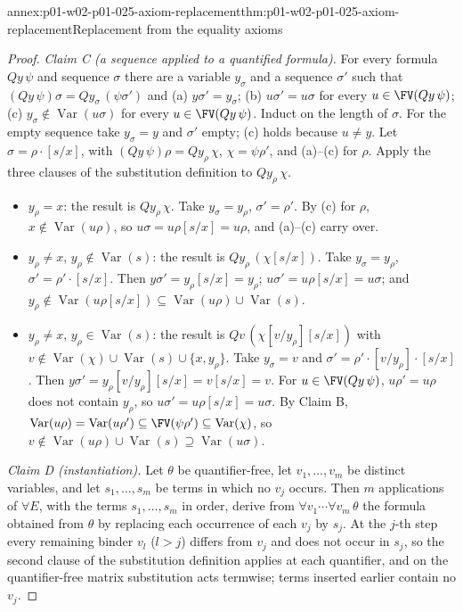 \begin{annexitem}{annex:p01-w02-p01-025-axiom-replacement}{thm:p01-w02-p01-025-axiom-replacement}{Replacement from the equality axioms}
\begin{proof}
\emph{Claim C (a sequence applied to a quantified formula).}  For every
formula \(Qy\,\psi\) and sequence \(\sigma\) there are a variable
\(y_\sigma\) and a sequence \(\sigma'\) such that
\((Qy\,\psi)\sigma=Qy_\sigma\,(\psi\sigma')\) and
(a) \(y\sigma'=y_\sigma\); (b) \(u\sigma'=u\sigma\) for every
\(u\in\FV(Qy\,\psi)\); (c) \(y_\sigma\notin\operatorname{Var}(u\sigma)\) for
every \(u\in\FV(Qy\,\psi)\).  Induct on the length of \(\sigma\).  For the
empty sequence take \(y_\sigma=y\) and \(\sigma'\) empty; (c) holds because
\(u\ne y\).  Let \(\sigma=\rho\cdot[s/x]\), with
\((Qy\,\psi)\rho=Qy_\rho\,\chi\), \(\chi=\psi\rho'\), and (a)--(c) for
\(\rho\).  Apply the three clauses of the substitution definition to
\(Qy_\rho\,\chi\).
\begin{itemize}
 \item \(y_\rho=x\): the result is \(Qy_\rho\,\chi\).  Take
 \(y_\sigma=y_\rho\), \(\sigma'=\rho'\).  By (c) for \(\rho\),
 \(x\notin\operatorname{Var}(u\rho)\), so \(u\sigma=u\rho[s/x]=u\rho\), and
 (a)--(c) carry over.
 \item \(y_\rho\ne x\), \(y_\rho\notin\operatorname{Var}(s)\): the result is
 \(Qy_\rho\,(\chi[s/x])\).  Take \(y_\sigma=y_\rho\),
 \(\sigma'=\rho'\cdot[s/x]\).  Then \(y\sigma'=y_\rho[s/x]=y_\rho\);
 \(u\sigma'=u\rho[s/x]=u\sigma\); and
 \(y_\rho\notin\operatorname{Var}(u\rho[s/x])\subseteq
 \operatorname{Var}(u\rho)\cup\operatorname{Var}(s)\).
 \item \(y_\rho\ne x\), \(y_\rho\in\operatorname{Var}(s)\): the result is
 \(Qv\,(\chi[v/y_\rho][s/x])\) with \(v\notin\operatorname{Var}(\chi)\cup
 \operatorname{Var}(s)\cup\{x,y_\rho\}\).  Take \(y_\sigma=v\) and
 \(\sigma'=\rho'\cdot[v/y_\rho]\cdot[s/x]\).  Then
 \(y\sigma'=y_\rho[v/y_\rho][s/x]=v[s/x]=v\).  For \(u\in\FV(Qy\,\psi)\),
 \(u\rho'=u\rho\) does not contain \(y_\rho\), so
 \(u\sigma'=u\rho[s/x]=u\sigma\).  By Claim B,
 \(\operatorname{Var}(u\rho)=\operatorname{Var}(u\rho')\subseteq
 \FV(\psi\rho')\subseteq\operatorname{Var}(\chi)\), so
 \(v\notin\operatorname{Var}(u\rho)\cup\operatorname{Var}(s)\supseteq
 \operatorname{Var}(u\sigma)\).
\end{itemize}

\emph{Claim D (instantiation).}  Let \(\theta\) be quantifier-free, let
\(v_1,\ldots,v_m\) be distinct variables, and let \(s_1,\ldots,s_m\) be terms
in which no \(v_j\) occurs.  Then \(m\) applications of \(\forall E\), with
the terms \(s_1,\ldots,s_m\) in order, derive from
\(\forall v_1\cdots\forall v_m\,\theta\) the formula obtained from \(\theta\)
by replacing each occurrence of each \(v_j\) by \(s_j\).  At the \(j\)-th step
every remaining binder \(v_l\) (\(l>j\)) differs from \(v_j\) and does not
occur in \(s_j\), so the second clause of the substitution definition applies
at each quantifier, and on the quantifier-free matrix substitution acts
termwise; terms inserted earlier contain no \(v_j\).


\end{proof}
\end{annexitem}
